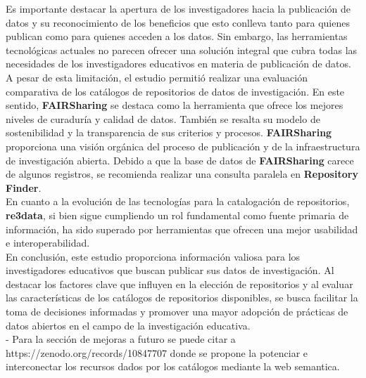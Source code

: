 \documentclass[runningheads]{llncs}
\begin{document}
Es importante destacar la apertura de los investigadores hacia la publicación de datos y su reconocimiento de los beneficios que esto conlleva tanto para quienes publican como para quienes acceden a los datos. Sin embargo, las herramientas tecnológicas actuales no parecen ofrecer una solución integral que cubra todas las necesidades de los investigadores educativos en materia de publicación de datos.\\

A pesar de esta limitación, el estudio permitió realizar una evaluación comparativa de los catálogos de repositorios de datos de investigación. En este sentido, \textbf{FAIRSharing} se destaca como la herramienta que ofrece los mejores niveles de curaduría y calidad de datos. También se resalta su modelo de sostenibilidad y la transparencia de sus criterios y procesos. \textbf{FAIRSharing} proporciona una visión orgánica del proceso de publicación y de la infraestructura de investigación abierta. Debido a que la base de datos de \textbf{FAIRSharing} carece de algunos registros, se recomienda realizar una consulta paralela en \textbf{Repository Finder}.\\

En cuanto a la evolución de las tecnologías para la catalogación de repositorios, \textbf{re3data}, si bien sigue cumpliendo un rol fundamental como fuente primaria de información, ha sido superado por herramientas que ofrecen una mejor usabilidad e interoperabilidad.\\

En conclusión, este estudio proporciona información valiosa para los investigadores educativos que buscan publicar sus datos de investigación. Al destacar los factores clave que influyen en la elección de repositorios y al evaluar las características de los catálogos de repositorios disponibles, se busca facilitar la toma de decisiones informadas y promover una mayor adopción de prácticas de datos abiertos en el campo de la investigación educativa.\\


- Para la sección de mejoras a futuro se puede citar a https://zenodo.org/records/10847707 donde se propone la potenciar e interconectar los recursos dados por los catálogos mediante la web semantica.




\end{document}
